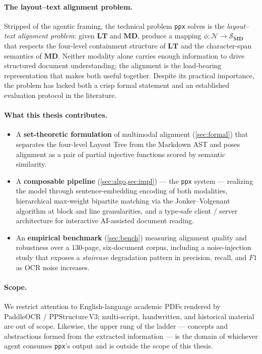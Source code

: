 \documentclass{article}
\theoremstyle{definition}
\newcommand{\LT}{\mathbf{LT}}
\newcommand{\MD}{\mathbf{MD}}
\newcommand{\Nodes}{\mathcal{N}}
\newcommand{\Spans}{\mathcal{S}}
\begin{document}
\paragraph{The layout--text alignment problem.}
Stripped of the agentic framing, the technical problem \texttt{ppx}
solves is the \emph{layout--text alignment problem}: given
$\LT$ and $\MD$, produce a mapping
$\phi : \Nodes \to \Spans_{\MD}$ that respects the four-level
containment structure of $\LT$ and the character-span semantics of
$\MD$.  Neither modality alone carries enough information to drive
structured document understanding; the alignment is the load-bearing
representation that makes both useful together.  Despite its
practical importance, the problem has lacked both a crisp formal
statement and an established evaluation protocol in the literature.

\paragraph{What this thesis contributes.}
\begin{itemize}
      \item A \textbf{set-theoretic formulation} of multimodal alignment
            (\cref{sec:formal}) that separates the four-level Layout Tree
            from the Markdown AST and poses alignment as a pair of partial
            injective functions scored by semantic similarity.
      \item A \textbf{composable pipeline} (\cref{sec:algo,sec:impl}) ---
            the \texttt{ppx} system --- realizing the model through
            sentence-embedding encoding of both modalities, hierarchical
            max-weight bipartite matching via the Jonker--Volgenant
            algorithm at block and line granularities, and a type-safe
            client / server architecture for interactive AI-assisted
            document reading.
      \item An \textbf{empirical benchmark} (\cref{sec:bench}) measuring
            alignment quality and robustness over a 130-page, six-document
            corpus, including a noise-injection study that exposes a
            \emph{staircase} degradation pattern in precision, recall, and
            $F1$ as OCR noise increases.
\end{itemize}

\paragraph{Scope.}
We restrict attention to English-language academic PDFs rendered by
PaddleOCR / PPStructure\,V3; multi-script, handwritten, and
historical material are out of scope.  Likewise, the upper rung of
the ladder --- concepts and abstractions formed from the extracted
information --- is the domain of whichever agent consumes
\texttt{ppx}'s output and is outside the scope of this thesis.
\end{document}
